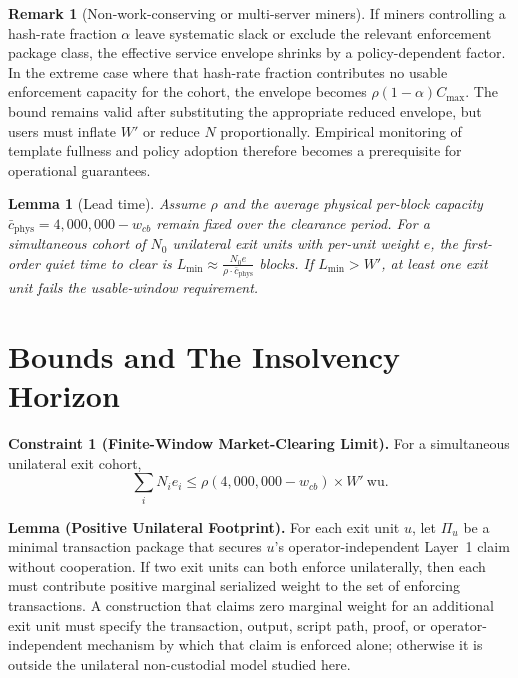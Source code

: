\documentclass{article}
\newtheorem{lemma}{Lemma}
\theoremstyle{definition}
\newtheorem{remark}{Remark}
\begin{document}
\begin{remark}[Non-work-conserving or multi-server miners]
If miners controlling a hash-rate fraction $\alpha$ leave systematic slack or exclude the relevant enforcement package class, the effective service envelope shrinks by a policy-dependent factor. In the extreme case where that hash-rate fraction contributes no usable enforcement capacity for the cohort, the envelope becomes $\rho (1-\alpha) C_{\max}$. The bound remains valid after substituting the appropriate reduced envelope, but users must inflate $W'$ or reduce $N$ proportionally. Empirical monitoring of template fullness and policy adoption therefore becomes a prerequisite for operational guarantees.
\end{remark}

\begin{lemma}[Lead time]
Assume $\rho$ and the average physical per-block capacity $\bar c_{\mathrm{phys}}=4{,}000{,}000-w_{cb}$ remain fixed over the clearance period. For a simultaneous cohort of $N_0$ unilateral exit units with per-unit weight $e$, the first-order quiet time to clear is $L_{\min} \approx \frac{N_0 e}{\rho \cdot \bar c_{\mathrm{phys}}}$ blocks. If $L_{\min} > W'$, at least one exit unit fails the usable-window requirement.
\end{lemma}

\section{Bounds and The Insolvency Horizon}
\noindent\textbf{Constraint 1 (Finite-Window Market-Clearing Limit).} For a simultaneous unilateral exit cohort,
\small
\begin{equation*}
\sum_i N_i e_i \leq \rho (4{,}000{,}000 - w_{cb}) \times W'~\mathrm{wu}.
\end{equation*}
\normalsize

\medskip
\noindent\textbf{Lemma (Positive Unilateral Footprint).}\label{lem:disjointness}
For each exit unit $u$, let $\Pi_u$ be a minimal transaction package that secures $u$'s operator-independent Layer~1 claim without cooperation. If two exit units can both enforce unilaterally, then each must contribute positive marginal serialized weight to the set of enforcing transactions. A construction that claims zero marginal weight for an additional exit unit must specify the transaction, output, script path, proof, or operator-independent mechanism by which that claim is enforced alone; otherwise it is outside the unilateral non-custodial model studied here.
\end{document}
